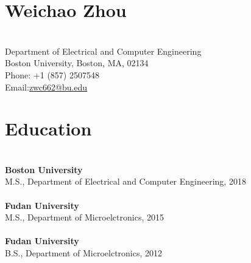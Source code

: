 



%
\section*{{Weichao Zhou}}\vspace{-4ex}
\hrulefill\\
Department of Electrical and Computer Engineering\\
Boston University, Boston, MA, 02134\\
Phone: +1 (857) 2507548\\
Email:\href{mailto:zwc662@bu.edu}{zwc662@bu.edu} \\

\section*{Education}\vspace{-4ex}
\hrulefill\\
\textbf{Boston University} \\
	M.S., Department of Electrical and Computer Engineering, 2018\\
\\\textbf{Fudan University} \\
	M.S., Department of Microelctronics, 2015 \\
\\\textbf{Fudan University} \\
	B.S., Department of Microelctronics, 2012 \\
	
